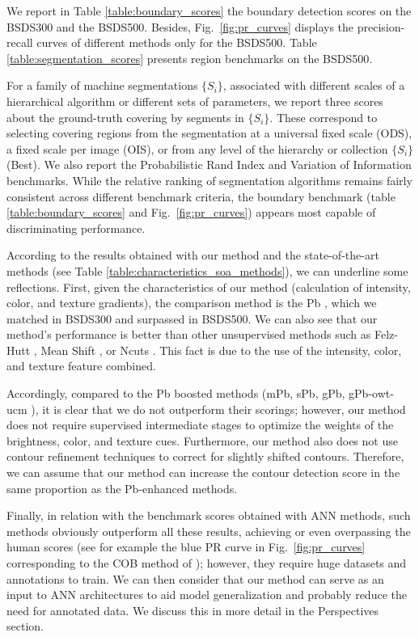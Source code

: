 We report in Table \ref{table:boundary_scores} the boundary detection scores on the BSDS300 and the BSDS500. Besides, Fig.\ \ref{fig:pr_curves} displays the precision-recall curves of different methods only for the BSDS500. Table \ref{table:segmentation_scores} presents region benchmarks on the BSDS500. 

For a family of machine segmentations $\{S_i\}$, associated with different scales of a hierarchical algorithm or different sets of parameters, we report three scores about the ground-truth covering by segments in $\{S_i\}$. These correspond to selecting covering regions from the segmentation at a universal fixed scale (ODS), a fixed scale per image (OIS), or from any level of the hierarchy or collection $\{S_i\}$ (Best). We also report the Probabilistic Rand Index and Variation of Information benchmarks. While the relative ranking of segmentation algorithms remains fairly consistent across different benchmark criteria, the boundary benchmark (table \ref{table:boundary_scores} and Fig.\ \ref{fig:pr_curves}) appears most capable of discriminating performance.

According to the results obtained with our method and the state-of-the-art methods (see Table \ref{table:characteristics_soa_methods}), we can underline some reflections. First, given the characteristics of our method (calculation of intensity, color, and texture gradients), the comparison method is the Pb \citep{Malik.Belongie.ea:IJCV:2001}, which we matched in BSDS300 and surpassed in BSDS500.  We can also see that our method's performance is better than other unsupervised methods such as Felz-Hutt \citep{Felzenszwalb.Huttenlocher:IJCV:2004}, Mean Shift \citep{Comaniciu.Meer:PAMI:2002}, or Ncuts \citep{JianboShi.Malik:PAMI:2000}. This fact is due to the use of the intensity, color, and texture feature combined.

Accordingly, compared to the Pb boosted methods (mPb, sPb, gPb, gPb-owt-ucm \citep{Arbelaez.Maire.ea:PR:2009}), it is clear that we do not outperform their scorings; however, our method does not require supervised intermediate stages to optimize the weights of the brightness, color, and texture cues. Furthermore, our method also does not use contour refinement techniques to correct for slightly shifted contours. Therefore, we can assume that our method can increase the contour detection score in the same proportion as the Pb-enhanced methods. 

Finally, in relation with the benchmark scores obtained with ANN methods, such methods obviously outperform all these results, achieving or even overpassing the human scores (see for example the blue PR curve in Fig.\ \ref{fig:pr_curves} corresponding to the COB method of \cite{Kelm.Rao.ea:CAIP:2019}); however, they require huge datasets and annotations to train. We can then consider that our method can serve as an input to ANN architectures to aid model generalization and probably reduce the need for annotated data. We discuss this in more detail in the Perspectives section.


